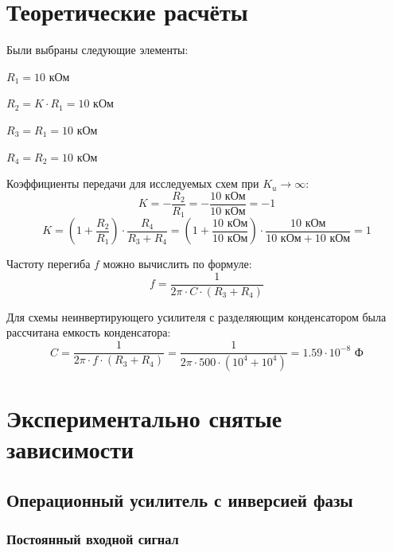 \section{Теоретические расчёты}

Были выбраны следующие элементы:
\begin{center}
	$R_1 = 10$ кОм
	
	$R_2 = K\cdot R_1 = 10$ кОм

	$R_3 = R_1 = 10$ кОм

	$R_4 = R_2 = 10$ кОм
\end{center}

Коэффициенты передачи для исследуемых схем при $K_u \rightarrow \infty$:
\begin{equation}
\label{eq:4:1}
K = -\frac{R_2}{R_1} = -\frac{10\text{ кОм}}{10\text{ кОм}} = -1 
\end{equation}
\vspace{-0.75cm}
\begin{equation}
K = \left(1+\frac{R_2}{R_1}\right) \cdot \frac{R_4}{R_3 + R_4} = \left(1+\frac{10\text{ кОм}}{10\text{ кОм}}\right) \cdot \frac{10\text{ кОм}}{10\text{ кОм} + 10\text{ кОм}} = 1
\end{equation}

Частоту перегиба $f$ можно вычислить по формуле: 
\begin{equation}
f = \frac{1}{2 \pi \cdot C \cdot (R_3 + R_4)}
\end{equation}

Для схемы неинвертирующего усилителя с разделяющим конденсатором была рассчитана емкость конденсатора: \\
\begin{equation}
\label{eq:4:4}
	C = \frac{1}{2\pi \cdot f\cdot (R_3 + R_4)} = \frac{1}{2\pi \cdot 500\cdot  (10^4 + 10^4)} = 1.59\cdot 10^{-8}\text{ Ф}
\end{equation}

\section{Экспериментально снятые зависимости}

\subsection{Операционный усилитель с инверсией фазы}

\subsubsection{Постоянный входной сигнал}

